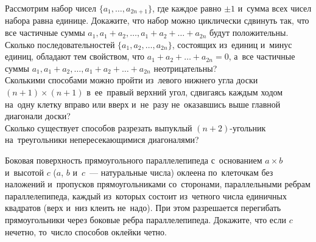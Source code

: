 \begin{problems}
\item
\subproblem
Рассмотрим набор чисел $\{ a_1, \ldots, a_{2n + 1} \}$, где каждое равно
$\pm 1$ и~сумма всех чисел набора равна единице.
Докажите, что набор можно циклически сдвинуть так, что все частичные суммы
$a_1, a_1 + a_2, \ldots,  a_1 + a_2 + \ldots + a_{2n}$ будут положительны.
\\
\subproblem
Сколько последовательностей $\{ a_1, a_2, \ldots, a_{2n} \}$, состоящих
из~единиц и~минус единиц, обладают тем свойством, что
$a_1 + a_2 + \ldots + a_{2n} = 0$, а~все частичные суммы
$a_1, a_1 + a_2, \ldots,  a_1 + a_2 + \ldots + a_{2n}$ неотрицательны?
\\
\subproblem
Сколькими способами можно пройти из~левого нижнего угла доски
$(n + 1) \times (n + 1)$ в~ее~правый верхний угол, сдвигаясь каждым ходом
на~одну клетку вправо или вверх и~не~разу не~оказавшись выше главной диагонали
доски?
\\
\subproblem
Сколько существует способов разрезать выпуклый $(n + 2)$-угольник
на~треугольники непересекающимися диагоналями?


\item
Боковая поверхность прямоугольного параллелепипеда с~основанием $a \times b$
и~высотой $c$ ($a$, $b$ и~$c$~--- натуральные числа) оклеена по~клеточкам без
наложений и~пропусков прямоугольниками со~сторонами, параллельными ребрам
параллелепипеда, каждый из~которых состоит из~четного числа единичных квадратов
(верх и~низ клеить не~надо).
При этом разрешается перегибать прямоугольники через боковые ребра
параллелепипеда.
Докажите, что если $c$ нечетно, то~число способов оклейки четно.

\end{problems}


